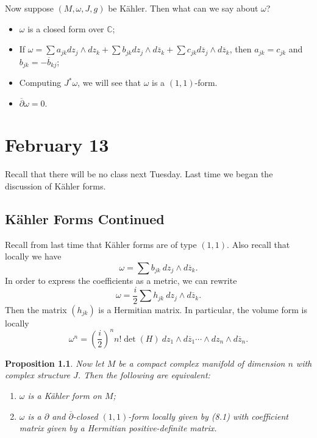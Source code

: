 \documentclass[leqno, openany]{memoir}
\newtheorem{prop}[thm]{Proposition}
\theoremstyle{definition}
\theoremstyle{remark}
\theoremstyle{plain}
\theoremstyle{definition}
\theoremstyle{remark}
\newcommand{\C}{\mathbb{C}}
\begin{document}
Now suppose $(M, \omega, J, g)$ be K\"ahler. Then what can we say about $\omega$?
\begin{itemize}
    \item $\omega$ is a closed form over $\C$;
    \item If $\omega = \sum a_{jk} dz_j \wedge dz_k + \sum b_{jk} dz_j \wedge d\overline{z}_k + \sum c_{jk} d\overline{z}_j \wedge d\overline{z}_k$, then $a_{jk} = c_{jk}$ and $b_{jk} = -\overline{b}_{kj}$;
    \item Computing $J^* \omega$, we will see that $\omega$ is a $(1,1)$-form.
    \item $\overline{\partial} \omega = 0$.
\end{itemize}

\chapter{February 13}%
\label{cha:february_13}

Recall that there will be no class next Tuesday. Last time we began the discussion of K\"ahler forms.

\section{K\"ahler Forms Continued}%
\label{sec:k"ahler_forms_continued}

Recall from last time that K\"ahler forms are of type $(1,1)$. Also recall that locally we have
\[ \omega = \sum b_{jk}\ dz_j \wedge d\overline{z}_k. \] In order to express the coefficients as a metric, we can rewrite
\begin{equation} \omega = \frac{i}{2} \sum h_{jk}\ dz_j \wedge d \overline{z}_k. \end{equation}
Then the matrix $(h_{jk})$ is a Hermitian matrix. In particular, the volume form is locally
\[ \omega^n = \left( \frac{i}{2} \right)^n n! \det(H)\ dz_1 \wedge d\overline{z}_1 \cdots \wedge dz_n \wedge d\overline{z}_n. \]

\begin{prop}
    Now let $M$ be a compact complex manifold of dimension $n$ with complex structure $J$. Then the following are equivalent:
    \begin{enumerate}
        \item $\omega$ is a K\"ahler form on $M$;
        \item $\omega$ is a $\partial$ and $\overline{\partial}$-closed $(1,1)$-form locally given by (8.1) with coefficient matrix given by a Hermitian positive-definite matrix.
    \end{enumerate}
\end{prop}
\end{document}
